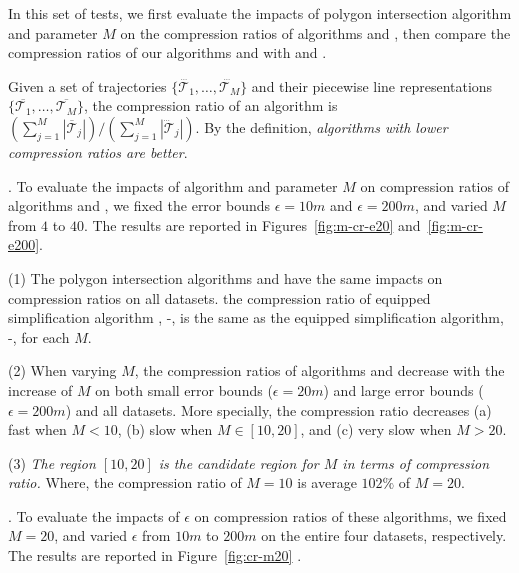 In this set of tests, we first evaluate the impacts of polygon intersection algorithm \rpia and parameter $M$ on the compression ratios of algorithms \cist and \cista, then compare the compression ratios of our algorithms \cist and \cista with \dpa and \squishe.

Given a set of trajectories $\{\dddot{\mathcal{T}_1}, \ldots, \dddot{\mathcal{T}_M}\}$ and their piecewise line representations $\{\overline{\mathcal{T}_1}, \ldots, \overline{\mathcal{T}_M}\}$, the compression ratio of an algorithm is $(\sum_{j=1}^{M} |\overline{\mathcal{T}}_j |)/(\sum_{j=1}^{M} |\dddot{\mathcal{T}}_j |)$.
By the definition, \emph{algorithms with lower compression ratios are better}.




.
To evaluate the impacts of algorithm \rpia and parameter $M$ on compression ratios of algorithms \cist and \cista, we fixed the error bounds \textcolor[rgb]{1.00,0.00,0.00}{$\epsilon =10m$} and $\epsilon =200m$, and varied $M$ from $4$ to $40$.
The results are reported in Figures~\ref{fig:m-cr-e20} and~\ref{fig:m-cr-e200}.


\ni(1) The polygon intersection algorithms \rpia and \cpia have the same impacts on compression ratios on all datasets. \eg the compression ratio of \rpia equipped simplification algorithm \cist, \ie \cist-\rpia, is the same as the \cpia equipped simplification algorithm, \ie \cist-\cpia, for each $M$.


\ni(2) When varying $M$, the compression ratios of algorithms \cist and \cista decrease with the increase of $M$ on both small error bounds \textcolor[rgb]{1.00,0.00,0.00}{(\eg $\epsilon = 20m$)} and large error bounds (\eg $\epsilon = 200m$) and all datasets.
More specially, the compression ratio decreases (a) fast when $M < 10$, (b) slow when $M \in [10, 20]$, and (c) very slow when $M  > 20$.


\ni(3) \emph{The region $[10, 20]$ is the candidate region for $M$ in terms of compression ratio.}
Where, the compression ratio of $M=10$ is average \textcolor[rgb]{1.00,0.00,0.00}{$102\%$} of $M=20$.


.
To evaluate the impacts of $\epsilon$ on compression ratios of these algorithms, we fixed $M=20$, and varied $\epsilon$ from $10m$ to $200m$ on the entire four datasets, respectively.
The results are reported in Figure~\ref{fig:cr-m20} .


